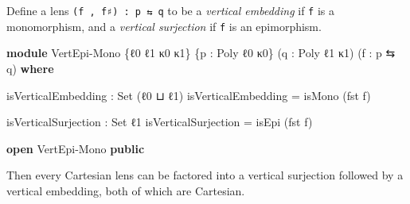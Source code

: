 \documentclass[
  11pt,
  oneside,
  article]{memoir}
\newenvironment{Shaded}{}{}
\newcommand{\DataTypeTok}[1]{\textcolor[rgb]{0.56,0.13,0.00}{#1}}
\newcommand{\KeywordTok}[1]{\textcolor[rgb]{0.00,0.44,0.13}{\textbf{#1}}}
\newcommand{\NormalTok}[1]{#1}
\newcommand{\OtherTok}[1]{\textcolor[rgb]{0.00,0.44,0.13}{#1}}
\theoremstyle{definition}
\theoremstyle{plain}
\newcommand{\0}{\textsf{0}}
\newcommand{\1}{\tn{\textsf{1}}}
\begin{document}
Define a lens \texttt{(f\ ,\ f♯)\ :\ p\ ⇆\ q} to be a \emph{vertical
embedding} if \texttt{f} is a monomorphism, and a \emph{vertical
surjection} if \texttt{f} is an epimorphism.

\begin{Shaded}
\begin{Highlighting}[]
\KeywordTok{module}\NormalTok{ VertEpi{-}Mono }\OtherTok{\{}\NormalTok{ℓ0 ℓ1 κ0 κ1}\OtherTok{\}} \OtherTok{\{}\NormalTok{p }\OtherTok{:}\NormalTok{ Poly ℓ0 κ0}\OtherTok{\}} 
                    \OtherTok{(}\NormalTok{q }\OtherTok{:}\NormalTok{ Poly ℓ1 κ1}\OtherTok{)} \OtherTok{(}\NormalTok{f }\OtherTok{:}\NormalTok{ p ⇆ q}\OtherTok{)} \KeywordTok{where}

\NormalTok{    isVerticalEmbedding }\OtherTok{:} \DataTypeTok{Set} \OtherTok{(}\NormalTok{ℓ0 ⊔ ℓ1}\OtherTok{)}
\NormalTok{    isVerticalEmbedding }\OtherTok{=}\NormalTok{ isMono }\OtherTok{(}\NormalTok{fst f}\OtherTok{)}

\NormalTok{    isVerticalSurjection }\OtherTok{:} \DataTypeTok{Set}\NormalTok{ ℓ1}
\NormalTok{    isVerticalSurjection }\OtherTok{=}\NormalTok{ isEpi }\OtherTok{(}\NormalTok{fst f}\OtherTok{)}

\KeywordTok{open}\NormalTok{ VertEpi{-}Mono }\KeywordTok{public}
\end{Highlighting}
\end{Shaded}

Then every Cartesian lens can be factored into a vertical surjection
followed by a vertical embedding, both of which are Cartesian.
\end{document}
